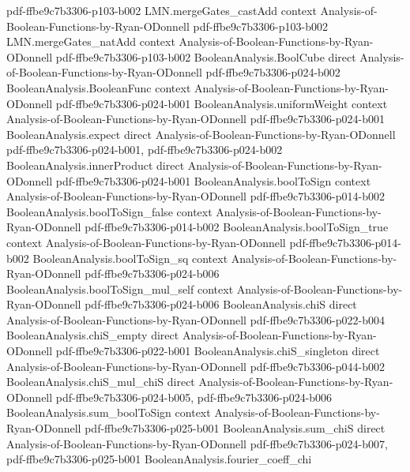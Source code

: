 \begin{lemma}
  {pdf-ffbe9c7b3306-p103-b002}
\proofstep
  {LMN.mergeGates_castAdd}
  {context}
  {Analysis-of-Boolean-Functions-by-Ryan-ODonnell}
  {pdf-ffbe9c7b3306-p103-b002}
\proofstep
  {LMN.mergeGates_natAdd}
  {context}
  {Analysis-of-Boolean-Functions-by-Ryan-ODonnell}
  {pdf-ffbe9c7b3306-p103-b002}
\proofstep
  {BooleanAnalysis.BoolCube}
  {direct}
  {Analysis-of-Boolean-Functions-by-Ryan-ODonnell}
  {pdf-ffbe9c7b3306-p024-b002}
\proofstep
  {BooleanAnalysis.BooleanFunc}
  {context}
  {Analysis-of-Boolean-Functions-by-Ryan-ODonnell}
  {pdf-ffbe9c7b3306-p024-b001}
\proofstep
  {BooleanAnalysis.uniformWeight}
  {context}
  {Analysis-of-Boolean-Functions-by-Ryan-ODonnell}
  {pdf-ffbe9c7b3306-p024-b001}
\proofstep
  {BooleanAnalysis.expect}
  {direct}
  {Analysis-of-Boolean-Functions-by-Ryan-ODonnell}
  {pdf-ffbe9c7b3306-p024-b001,
    pdf-ffbe9c7b3306-p024-b002}
\proofstep
  {BooleanAnalysis.innerProduct}
  {direct}
  {Analysis-of-Boolean-Functions-by-Ryan-ODonnell}
  {pdf-ffbe9c7b3306-p024-b001}
\proofstep
  {BooleanAnalysis.boolToSign}
  {context}
  {Analysis-of-Boolean-Functions-by-Ryan-ODonnell}
  {pdf-ffbe9c7b3306-p014-b002}
\proofstep
  {BooleanAnalysis.boolToSign_false}
  {context}
  {Analysis-of-Boolean-Functions-by-Ryan-ODonnell}
  {pdf-ffbe9c7b3306-p014-b002}
\proofstep
  {BooleanAnalysis.boolToSign_true}
  {context}
  {Analysis-of-Boolean-Functions-by-Ryan-ODonnell}
  {pdf-ffbe9c7b3306-p014-b002}
\proofstep
  {BooleanAnalysis.boolToSign_sq}
  {context}
  {Analysis-of-Boolean-Functions-by-Ryan-ODonnell}
  {pdf-ffbe9c7b3306-p024-b006}
\proofstep
  {BooleanAnalysis.boolToSign_mul_self}
  {context}
  {Analysis-of-Boolean-Functions-by-Ryan-ODonnell}
  {pdf-ffbe9c7b3306-p024-b006}
\proofstep
  {BooleanAnalysis.chiS}
  {direct}
  {Analysis-of-Boolean-Functions-by-Ryan-ODonnell}
  {pdf-ffbe9c7b3306-p022-b004}
\proofstep
  {BooleanAnalysis.chiS_empty}
  {direct}
  {Analysis-of-Boolean-Functions-by-Ryan-ODonnell}
  {pdf-ffbe9c7b3306-p022-b001}
\proofstep
  {BooleanAnalysis.chiS_singleton}
  {direct}
  {Analysis-of-Boolean-Functions-by-Ryan-ODonnell}
  {pdf-ffbe9c7b3306-p044-b002}
\proofstep
  {BooleanAnalysis.chiS_mul_chiS}
  {direct}
  {Analysis-of-Boolean-Functions-by-Ryan-ODonnell}
  {pdf-ffbe9c7b3306-p024-b005,
    pdf-ffbe9c7b3306-p024-b006}
\proofstep
  {BooleanAnalysis.sum_boolToSign}
  {context}
  {Analysis-of-Boolean-Functions-by-Ryan-ODonnell}
  {pdf-ffbe9c7b3306-p025-b001}
\proofstep
  {BooleanAnalysis.sum_chiS}
  {direct}
  {Analysis-of-Boolean-Functions-by-Ryan-ODonnell}
  {pdf-ffbe9c7b3306-p024-b007,
    pdf-ffbe9c7b3306-p025-b001}
\proofstep
  {BooleanAnalysis.fourier_coeff_chi}

\end{lemma}
